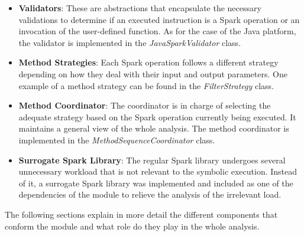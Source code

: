 \begin{itemize}
	\item \textbf{Validators}: These are abstractions that encapsulate the necessary validations to determine if an executed instruction is a Spark operation or an invocation of the user-defined function. As for the case of the Java platform, the validator is implemented in the \textit{JavaSparkValidator} class.
	\item \textbf{Method Strategies}: Each Spark operation follows a different strategy depending on how they deal with their input and output parameters. One example of a method strategy can be found in the \textit{FilterStrategy} class.
	\item \textbf{Method Coordinator}: The coordinator is in charge of selecting the adequate strategy based on the Spark operation currently being executed. It maintains a general view of the whole analysis. The method coordinator is implemented in the \textit{MethodSequenceCoordinator} class.
	\item \textbf{Surrogate Spark Library}: The regular Spark library undergoes several unnecessary workload that is not relevant to the symbolic execution. Instead of it, a surrogate Spark library was implemented and included as one of the dependencies of the module to relieve the analysis of the irrelevant load.
\end{itemize}

The following sections explain in more detail the different components that conform the module and what role do they play in the whole analysis.






